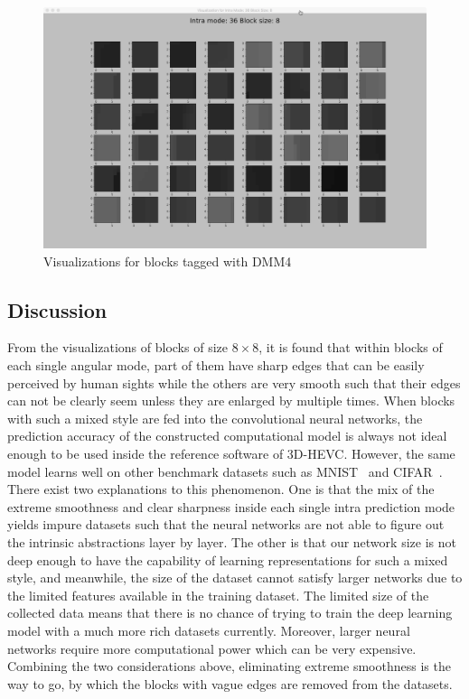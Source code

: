 \begin{figure}
        \vspace*{1cm} %
    
        \begin{minipage}{0.49\textwidth}
            \includegraphics[width=\linewidth]{Figures/visu-size8x8/8-36}
            \caption[Visualizations for blocks tagged with DMM4]{Visualizations for blocks tagged with DMM4}
            \label{fig:size8_mode36}
        \end{minipage}
    \end{figure}

\subsection{Discussion}\label{subsec:discussion-about-data-visu}
From the visualizations of blocks of size $8\times8$,
it is found that within blocks of each single angular mode,
part of them have sharp edges that can 
be easily perceived by human sights while the others 
are very smooth such that their edges can not be clearly seem
unless they are enlarged by multiple times.
When blocks with such a mixed style are fed into the 
convolutional neural networks, the prediction accuracy
of the constructed computational model
is always not ideal enough to be used
inside the reference software of 3D-HEVC\@.
However, the same model learns well on other 
benchmark datasets such as 
MNIST~\parencite{XRN001} and CIFAR~\parencite{XRN002}.
There exist two explanations to this phenomenon.
One is that the mix of the extreme smoothness and
clear sharpness inside each single intra prediction mode
yields impure datasets such that the neural networks
are not able to figure out the intrinsic abstractions
layer by layer.
The other is that our network size is not deep enough
to have the capability of learning representations 
for such a mixed style, and meanwhile, the size of 
the dataset cannot satisfy larger networks
due to the limited features available in the 
training dataset.
The limited size of the collected data means that
there is no chance of trying to train the deep learning
model with a much more rich datasets currently.
Moreover, larger neural networks require more 
computational power which can be very expensive.
Combining the two considerations above, 
eliminating extreme smoothness is the way to go,
by which the blocks with vague edges are removed
from the datasets.

